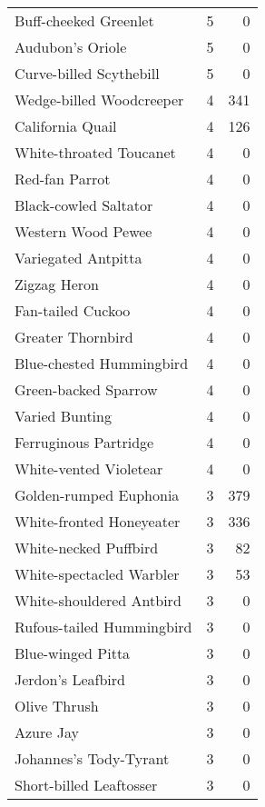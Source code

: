 \begin{longtable}{l r r}
Buff-cheeked Greenlet           &5    &0     \\
Audubon's Oriole                &5    &0     \\
Curve-billed Scythebill         &5    &0     \\
Wedge-billed Woodcreeper        &4    &341   \\
California Quail                &4    &126   \\
White-throated Toucanet         &4    &0     \\
Red-fan Parrot                  &4    &0     \\
Black-cowled Saltator           &4    &0     \\
Western Wood Pewee              &4    &0     \\
Variegated Antpitta             &4    &0     \\
Zigzag Heron                    &4    &0     \\
Fan-tailed Cuckoo               &4    &0     \\
Greater Thornbird               &4    &0     \\
Blue-chested Hummingbird        &4    &0     \\
Green-backed Sparrow            &4    &0     \\
Varied Bunting                  &4    &0     \\
Ferruginous Partridge           &4    &0     \\
White-vented Violetear          &4    &0     \\
Golden-rumped Euphonia          &3    &379   \\
White-fronted Honeyeater        &3    &336   \\
White-necked Puffbird           &3    &82    \\
White-spectacled Warbler        &3    &53    \\
White-shouldered Antbird        &3    &0     \\
Rufous-tailed Hummingbird       &3    &0     \\
Blue-winged Pitta               &3    &0     \\
Jerdon's Leafbird               &3    &0     \\
Olive Thrush                    &3    &0     \\
Azure Jay                       &3    &0     \\
Johannes's Tody-Tyrant          &3    &0     \\
Short-billed Leaftosser         &3    &0     \\

\end{longtable}
